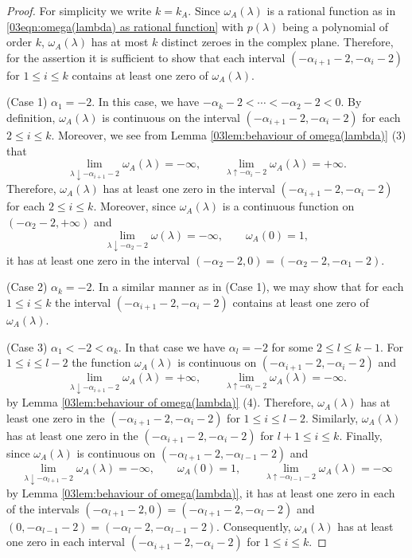 \documentclass[10pt,a4paper]{amsart}
\begin{document}
\begin{proof}
For simplicity we write $k=k_A$.
Since $\omega_A(\lambda)$ is a rational function
as in \eqref{03eqn:omega(lambda) as rational function}
with $p(\lambda)$ being a polynomial of order $k$,
$\omega_A(\lambda)$ has at most $k$ distinct zeroes
in the complex plane.
Therefore, for the assertion it is sufficient to show that
each interval $(-\alpha_{i+1}-2,-\alpha_i-2)$
for $1\le i\le k$
contains at least one zero of $\omega_A(\lambda)$.

(Case 1) $\alpha_1=-2$. 
In this case, we have $-\alpha_k-2<\dotsb<-\alpha_2-2<0$.
By definition,
$\omega_A(\lambda)$ is continuous on the interval
$(-\alpha_{i+1}-2,-\alpha_i-2)$ for each $2\le i\le k$.
Moreover, 
we see from Lemma \ref{03lem:behaviour of omega(lambda)} (3) that
\[
\lim_{\lambda\downarrow -\alpha_{i+1}-2}\omega_A(\lambda)=-\infty,
\qquad
\lim_{\lambda\uparrow -\alpha_i-2}\omega_A(\lambda)=+\infty.
\]
Therefore, $\omega_A(\lambda)$ has at least one zero
in the interval $(-\alpha_{i+1}-2,-\alpha_i-2)$ for each $2\le i\le k$.
Moreover, since 
$\omega_A(\lambda)$ is a continuous function on
$(-\alpha_2-2,+\infty)$ and
\[
\lim_{\lambda\downarrow -\alpha_2-2}\omega(\lambda)=-\infty,
\qquad
\omega_A(0)=1,
\]
it has at least one zero
in the interval $(-\alpha_2-2,0)=(-\alpha_2-2,-\alpha_1-2)$.

(Case 2) $\alpha_k=-2$. In a similar manner as in (Case 1),
we may show that
for each $1\le i\le k$ the interval $(-\alpha_{i+1}-2,-\alpha_i-2)$
contains at least one zero of $\omega_A(\lambda)$.


(Case 3) $\alpha_1<-2<\alpha_k$. In that case we have
$\alpha_l=-2$ for some $2\le l \le k-1$.
For $1\le i\le l-2$ the function $\omega_A(\lambda)$ is continuous
on $(-\alpha_{i+1}-2,-\alpha_i-2)$ and
\[
\lim_{\lambda\downarrow -\alpha_{i+1}-2}\omega_A(\lambda)=+\infty,
\qquad
\lim_{\lambda\uparrow -\alpha_i-2}\omega_A(\lambda)=-\infty.
\]
by Lemma \ref{03lem:behaviour of omega(lambda)} (4).
Therefore, $\omega_A(\lambda)$ has at least one zero
in the $(-\alpha_{i+1}-2,-\alpha_i-2)$ for $1\le i\le l-2$.
Similarly, $\omega_A(\lambda)$ has at least one zero
in the $(-\alpha_{i+1}-2,-\alpha_i-2)$ for
$l+1\le i\le k$.
Finally, since $\omega_A(\lambda)$ is continuous
on $(-\alpha_{l+1}-2,-\alpha_{l-1}-2)$ and
\[
\lim_{\lambda\downarrow -\alpha_{l+1}-2}\omega_A(\lambda)=-\infty,
\qquad
\omega_A(0)=1,
\qquad
\lim_{\lambda\uparrow -\alpha_{l-1}-2}\omega_A(\lambda)=-\infty
\]
by Lemma \ref{03lem:behaviour of omega(lambda)},
it has at least one zero
in each of the intervals
$(-\alpha_{l+1}-2,0)=(-\alpha_{l+1}-2,-\alpha_l-2)$
and $(0,-\alpha_{l-1}-2)=(-\alpha_l-2,-\alpha_{l-1}-2)$.
Consequently, $\omega_A(\lambda)$ 
has at least one zero in each interval $(-\alpha_{i+1}-2,-\alpha_i-2)$
for $1\le i\le k$.
\end{proof}
\end{document}
